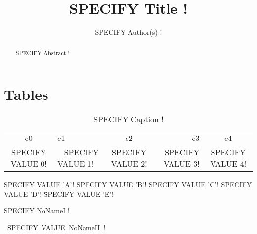 \documentclass[10pt,a4paper]{article}
\title{
SPECIFY Title ! %
}
\author{ %
SPECIFY Author(s) !
}
\begin{document}
\maketitle

\begin{abstract}
SPECIFY Abstract !
\end{abstract}

\section{Tables}

\begin{table}[!ht]
  \caption{ %
SPECIFY Caption !
}
  \tabcolsep=2mm 
  \centering
  \begin{tabular}[t]{clcrc}
c0 & c1 & c2 & c3 & c4 \\
\rule{0mm}{1.5em} %
  SPECIFY VALUE 0! %

 & %
~ %
  SPECIFY VALUE 1! %

 & %
  SPECIFY VALUE 2! %

 & %
  SPECIFY VALUE 3! %

 & %
  SPECIFY VALUE 4! %

\\
\hline
  \end{tabular}
\end{table}

\begin{center}

\begin{tabbing}
   SPECIFY VALUE 'A'! %
 \= %
   SPECIFY VALUE 'B'! %
 \= %
   SPECIFY VALUE 'C'! %
 \= %
   SPECIFY VALUE 'D'! %
 \= %
   SPECIFY VALUE 'E'! %
\end{tabbing}

\end{center}

SPECIFY NoNameI ! %

\mbox{
SPECIFY VALUE NoNameII !
}
\end{document}
